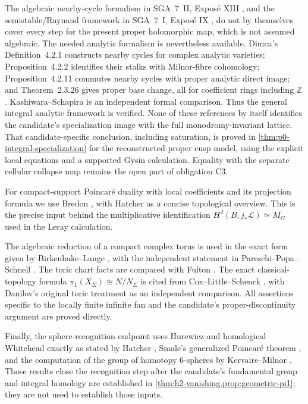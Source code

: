 The algebraic nearby-cycle formalism in SGA~7~II, Expos\'e XIII
\cite{SGA7II1973}, and the semistable/Raynaud framework in SGA~7~I,
Expos\'e IX \cite{SGA7I1972}, do not by themselves cover every step for the
present proper holomorphic map, which is not assumed algebraic.  The needed
analytic formalism is nevertheless available.  Dimca's Definition~4.2.1
constructs nearby cycles for complex analytic varieties; Proposition~4.2.2
identifies their stalks with Milnor-fibre cohomology; Proposition~4.2.11
commutes nearby cycles with proper analytic direct image; and
Theorem~2.3.26 gives proper base change, all for coefficient rings including
\(\mathbb Z\) \cite{Dimca2004}.  Kashiwara--Schapira
\cite[\S8.6]{KashiwaraSchapira1990} is an independent formal comparison.
Thus the general integral analytic framework is verified.  None of these
references by itself identifies the candidate's specialization image with
the full monodromy-invariant lattice.  That candidate-specific conclusion,
including saturation, is proved in
\cref{thm:p0-integral-specialization} for the reconstructed proper cusp
model, using the explicit local equations and a supported Gysin
calculation.  Equality with the separate cellular collapse map remains the
open part of obligation C3.

For compact-support Poincar\'e duality with local coefficients and its
projection formula we use Bredon \cite[Chapter~VI]{Bredon1997}, with
Hatcher \cite[\S3.H]{Hatcher2002} as a concise topological overview.  This
is the precise input behind the multiplicative identification
\(H^2(B,j_*\mathcal L)\simeq M_G\) used in the Leray calculation.

The algebraic reduction of a compact complex torus is used in the exact form
given by Birkenhake--Lange \cite[Chapter~2, \S6]{BirkenhakeLange1999}, with
the independent statement in Pareschi--Popa--Schnell
\cite[\S8, p.~2437]{PareschiPopaSchnell2017}.  The toric chart facts are
compared with Fulton \cite{Fulton1993}.  The exact classical-topology formula
\(\pi_1(X_\Sigma)\cong N/N_\Sigma\) is cited from Cox--Little--Schenck
\cite[Theorem~12.1.10]{CoxLittleSchenck2011}, with Danilov's original toric
treatment \cite[\S9]{Danilov1978} as an independent comparison.  All
assertions specific to the locally finite infinite fan and the candidate's
proper-discontinuity argument are proved directly.

Finally, the sphere-recognition endpoint uses Hurewicz and homological
Whitehead exactly as stated by Hatcher
\cite[Theorem~4.32 and Corollary~4.33]{Hatcher2002}, Smale's generalized
Poincar\'e theorem \cite[Theorem~A]{Smale1961}, and the computation of the
group of homotopy $6$-spheres by Kervaire--Milnor
\cite[opening table]{KervaireMilnor1963}.  Those results close the recognition
step after the candidate's fundamental group and integral homology are
established in \cref{thm:h2-vanishing,prop:geometric-pi1}; they are not used
to establish those inputs.

